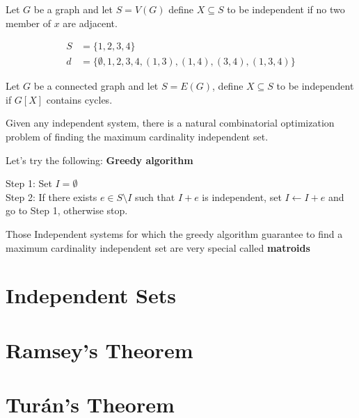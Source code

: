 			\begin{example}
				Let $G$ be a graph and let $S = V(G)$ define $X \subseteq S$ to be independent if no two member of $x$ are adjacent.
			\end{example}

			\begin{figure}
				\centering
			\end{figure}

			\begin{align}
				S &= \{1, 2, 3, 4\} \\
				d &= \{\emptyset, 1, 2, 3, 4, (1, 3), (1, 4), (3, 4), (1, 3, 4)\}
			\end{align}

			\begin{example}
				Let $G$ be a connected graph and let $S = E(G)$, define $X \subseteq S$ to be independent if $G[X]$ contains cycles.
			\end{example}

			Given any independent system, there is a natural combinatorial optimization problem of finding the maximum cardinality independent set. 

			Let's try the following: \textbf{Greedy algorithm}

			Step 1: Set $I=\emptyset$\\
			Step 2: If there exists $e\in S \setminus I$ such that $I + e$ is independent, set $I \leftarrow I+e$ and go to Step 1, otherwise stop.

			Those Independent systems for which the greedy algorithm guarantee to find a maximum cardinality independent set are very special called \textbf{matroids}

		\section{Independent Sets}

		\section{Ramsey's Theorem}

		\section{Tur\'{a}n's Theorem}

